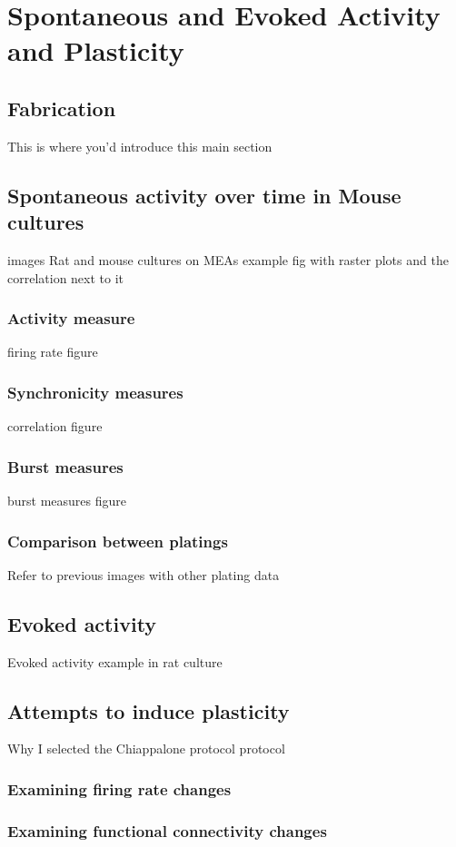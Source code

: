 \chapter{Spontaneous and Evoked Activity and Plasticity}
\label{chap:activity}



	\section{Fabrication}

This is where you'd introduce this main section
    \section{Spontaneous activity over time in Mouse cultures}
        images Rat and mouse cultures on MEAs
        example fig with raster plots and the correlation next to it
        \subsection{Activity measure}
        firing rate figure
        \subsection{Synchronicity measures}
        correlation figure
        \subsection{Burst measures}
        burst measures figure
        \subsection{Comparison between platings}
        Refer to previous images with other plating data
    \section{Evoked activity}
    Evoked activity example in rat culture
    \section{Attempts to induce plasticity}
    Why I selected the Chiappalone  protocol protocol
        \subsection{Examining firing rate changes}
        \subsection{Examining functional connectivity changes}



